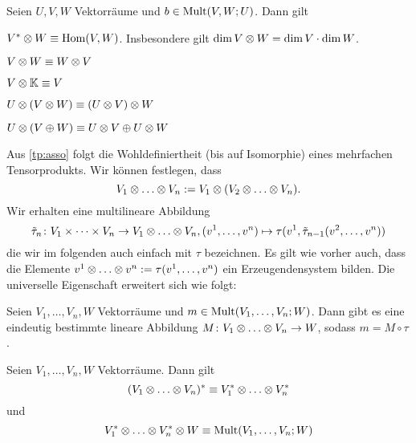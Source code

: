 \begin{proposition}
  Seien $U,V,W$ Vektorräume und $b\in\operatorname{Mult}(V,W;U)$. Dann gilt
  \begin{statements}
  \item $V^*\otimes W \equiv \operatorname{Hom}(V,W)$. Insbesondere gilt $\dim
    V\otimes W = \dim V \cdot \dim W$.
  \item $V\otimes W \equiv W\otimes V$
  \item $V\otimes\mathbb{K} \equiv V$
  \item\label{tp:asso} $U\otimes(V\otimes W) \equiv (U\otimes V)\otimes W$
  \item $U\otimes(V\oplus W) \equiv U\otimes V \oplus U\otimes W$
  \end{statements}
\end{proposition}

\begin{bemerkung}
  Aus \ref{tp:asso} folgt die Wohldefiniertheit (bis auf Isomorphie)
  eines mehrfachen Tensorprodukts. Wir können festlegen, dass
  \begin{equation*}
    V_1\tensordots V_n := V_1\tensor (V_2\tensordots V_n).
  \end{equation*}
  Wir erhalten eine multilineare Abbildung
  \begin{equation*}
    \tilde\tau_n \colon V_1\dotted{\times}V_n \to
    V_1\tensordots V_n, (v^1,\dots,v^n) \mapsto \tau(v^1,\tilde\tau_{n-1}(v^2,\dots, v^n))
  \end{equation*}
  die  wir im folgenden auch einfach mit $\tau$ bezeichnen. Es gilt
  wie vorher auch, dass die Elemente $v^1\tensordots v^n :=
  \tau(v^1,\dots,v^n)$ ein Erzeugendensystem bilden. Die
  universelle Eigenschaft erweitert sich wie folgt:
\end{bemerkung}
\begin{proposition}
  Seien $V_1,\dots,V_n,W$ Vektorräume und $m\in
  \operatorname{Mult}(V_1,\dots,V_n;W)$. Dann gibt es eine eindeutig bestimmte
  lineare Abbildung $M\colon V_1\tensordots V_n \to W$, sodass $m =
  M\circ \tau$.
\end{proposition}

\begin{proposition}
  Seien $V_1,\dots,V_n,W$ Vektorräume. Dann gilt
  \begin{equation*}
    (V_1\tensordots V_n)^* \equiv V_1^*\tensordots V_n^*
  \end{equation*}
  und
  \begin{equation*}
    V_1^*\tensordots V_n^*\tensor W \equiv \Mult(V_1,\dots,V_n;W)
  \end{equation*}
\end{proposition}


